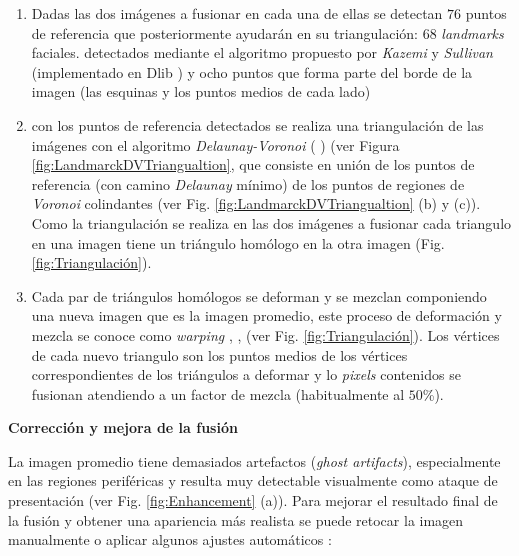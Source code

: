 \begin{enumerate}

\item 
Dadas las dos imágenes a fusionar en cada una de ellas se detectan $76$ puntos de referencia que posteriormente ayudarán en su triangulación: $68$ \textit{\glspl{landmark}} faciales. detectados mediante el algoritmo propuesto por \textit{Kazemi} y \textit{Sullivan} \cite{kazemi2014one} (implementado en \Gls{Dlib} \cite{dlibOnline}) y ocho puntos que forma parte del borde de la imagen (las esquinas y los puntos medios de cada lado)

\item 
con los puntos de referencia detectados se realiza una triangulación de las imágenes con el algoritmo \textit{Delaunay-Voronoi} ( \cite{lokhande2013morphing}) (ver Figura \ref{fig:LandmarckDVTriangualtion}, que consiste en unión de los puntos de referencia (con camino \textit{Delaunay} mínimo) de los puntos de regiones de \textit{Voronoi} colindantes (ver Fig. \ref{fig:LandmarckDVTriangualtion} (b) y (c)). Como la triangulación se realiza en las dos imágenes a fusionar cada triangulo en una imagen  tiene un triángulo homólogo en la otra imagen (Fig. \ref{fig:Triangulación}).

\item 
Cada par de triángulos homólogos se deforman y se mezclan componiendo una nueva imagen que es la imagen promedio, este proceso de deformación y mezcla se conoce como \textit{warping} \cite{wu2011face}, \cite{jassim2018automatic}, \cite{hildebrandt2017benchmarking} (ver Fig. \ref{fig:Triangulación}). Los vértices de cada nuevo triangulo son los puntos medios de los vértices correspondientes de los triángulos a deformar y lo \textit{pixels} contenidos se fusionan atendiendo a un factor de mezcla (habitualmente al $50$\%). 

\end{enumerate}

\medskip
\textbf{Corrección y mejora de la fusión}
\medskip


La imagen promedio tiene demasiados artefactos (\textit{ghost artifacts}), especialmente en las regiones periféricas y resulta muy detectable visualmente como ataque de presentación (ver Fig. \ref{fig:Enhancement} (a)). Para mejorar el resultado final de la fusión y obtener una apariencia más realista se puede retocar la imagen manualmente \cite{ferrara2014magic} o aplicar algunos ajustes automáticos \cite{ferrara2017face}:

